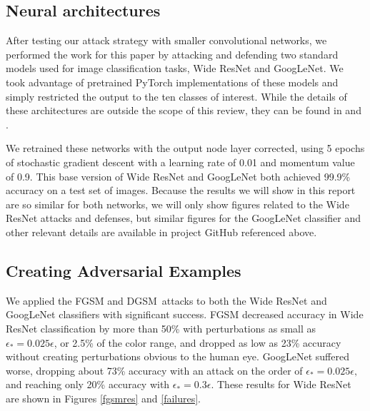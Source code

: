 \documentclass[conference]{IEEEtran}
\begin{document}
\subsection{Neural architectures}

After testing our attack strategy with smaller convolutional networks, we
performed the work for this paper by attacking and defending two standard
models used for image classification tasks, Wide ResNet and GoogLeNet. We
took advantage of pretrained PyTorch implementations of these models and
simply restricted the output to the ten classes of interest. While the
details of these architectures are outside the scope of this review, they
can be found in \cite{zagoruyko2016wide} and \cite{szegedy2015going}.

We retrained these networks with the output node layer corrected, using 5
epochs of stochastic gradient descent with a learning rate of 0.01 and
momentum value of 0.9. This base version of Wide ResNet and GoogLeNet both
achieved 99.9\% accuracy on a test set of images. Because the results we
will show in this report are so similar for both networks, we will only show
figures related to the Wide ResNet attacks and defenses, but similar figures
for the GoogLeNet classifier and other relevant details are available in
project GitHub referenced above.

\subsection{Creating Adversarial Examples}

We applied the FGSM and DGSM\ attacks to both the Wide ResNet and GoogLeNet
classifiers with significant success. FGSM decreased accuracy in Wide ResNet
classification by more than 50\% with perturbations as small as $\epsilon
_{\ast }=0.025\epsilon $, or 2.5\% of the color range, and dropped as low as
23\% accuracy without creating perturbations obvious to the human eye.
GoogLeNet suffered worse, dropping about 73\% accuracy with an attack on the
order of $\epsilon _{\ast }=0.025\epsilon ,$ and reaching only 20\% accuracy
with $\epsilon _{\ast }=0.3\epsilon .$ These results for Wide ResNet are
shown in Figures \ref{fgsmres} and \ref{failures}. \bigskip

\begin{figure*}[h]
\centering%
\texttt{[image: \{Plots/plots\_base/imagenette\_samples\_fgsm\_plots.jpg]}}
\caption{Results of an FGSM attack on the Wide ResNet classifier at various
small values of $\protect\epsilon _{\ast }$.}
\label{fgsmres}
\end{figure*}
\end{document}
